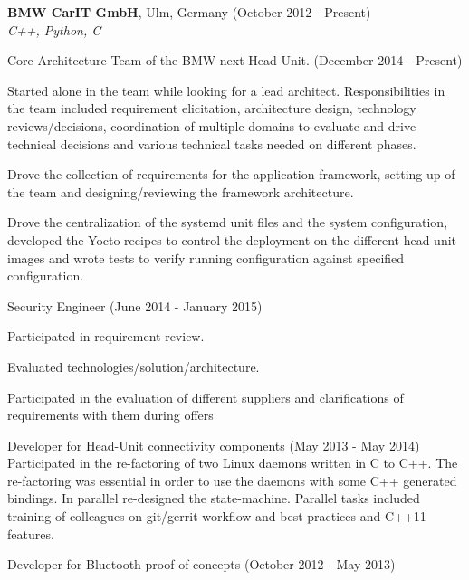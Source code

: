 \documentclass[alan.tex]{subfiles}
\begin{document}
  \item \textbf{BMW CarIT GmbH}, Ulm, Germany (October 2012 - Present)\\
    \emph{C++, Python, C}
    \begin{my_desc}
      \item[Core Architecture Team] of the BMW next Head-Unit. (December 2014 - Present)
        \begin{my_bullets}
          \item Started alone in the team while looking for a lead architect. Responsibilities in the team
            included requirement elicitation, architecture design, technology reviews/decisions,
            coordination of multiple domains to evaluate and drive technical decisions and various
            technical tasks needed on different phases.
          \item Drove the collection of requirements for the application framework, setting up of the team
            and designing/reviewing the framework architecture.
          \item Drove the centralization of the systemd unit files and the system configuration, developed the
            Yocto recipes to control the deployment on the different head unit images and wrote tests to
            verify running configuration against specified configuration.
        \end{my_bullets}
      \item[Security Engineer] (June 2014 - January 2015)
        \begin{my_bullets}
          \item Participated in requirement review.
          \item Evaluated technologies/solution/architecture.
          \item Participated in the evaluation of different suppliers and clarifications of requirements with them
            during offers
        \end{my_bullets}
      \item[Developer] for Head-Unit connectivity components (May 2013 - May 2014)
        Participated in the re-factoring of two Linux daemons written in C to C++. The re-factoring was essential
        in order to use the daemons with some C++ generated bindings. In parallel re-designed the state-machine.
        Parallel tasks included training of colleagues on git/gerrit workflow and best practices and C++11 features.
      \item[Developer] for Bluetooth proof-of-concepts (October 2012 - May 2013)

\end{my_desc}
\end{document}
